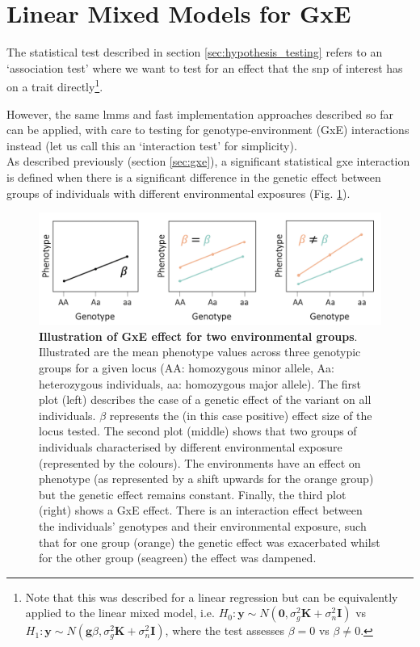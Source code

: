 \section{Linear Mixed Models for GxE}
\label{sec:lmm_gxe}

The  statistical test described in section \ref{sec:hypothesis_testing} refers to an `association test' where we want to test for an effect that the \gls{snp} of interest has on a trait directly\footnote{Note that this was described for a linear regression but can be equivalently applied to the linear mixed model, i.e. $H_0: \mathbf{y} \sim N (\mathbf{0}, \sigma_g^2\mathbf{K} + \sigma_n^2\mathbf{I})$ vs $H_1: \mathbf{y} \sim N (\mathbf{g}\beta, \sigma_g^2\mathbf{K} + \sigma_n^2\mathbf{I})$, where the test assesses $\beta = 0$ vs $\beta \neq 0$.}.

However, the same \gls{lmm}s and fast implementation approaches described so far can be applied, with care to testing for genotype-environment (GxE) interactions instead (let us call this an `interaction test' for simplicity).\\

As described previously (section \ref{sec:gxe}), a significant statistical \gls{gxe} interaction is defined when there is a significant difference in the genetic effect between groups of individuals with different environmental exposures (Fig. \ref{fig:gxe}).

\begin{figure}[h]
\centering
\includegraphics[width=15cm]{Chapter1/Fig/GxE.png}
\caption[Illustration of GxE]{\textbf{Illustration of GxE effect for two environmental groups}.\\
Illustrated are the mean phenotype values across three genotypic groups for a given locus (AA: homozygous minor allele, Aa: heterozygous individuals, aa: homozygous major allele).
The first plot (left) describes the case of a genetic effect of the variant on all individuals. 
$\beta$ represents the (in this case positive) effect size of the locus tested. 
The second plot (middle) shows that two groups of individuals characterised by different environmental exposure (represented by the colours). 
The environments have an effect on phenotype (as represented by a shift upwards for the orange group) but the genetic effect remains constant. 
Finally, the third plot (right) shows a GxE effect.
There is an interaction effect between the individuals' genotypes and their environmental exposure, such that for one group (orange) the genetic effect was exacerbated whilst for the other group (seagreen) the effect was dampened.}
\label{fig:gxe}
\end{figure}


